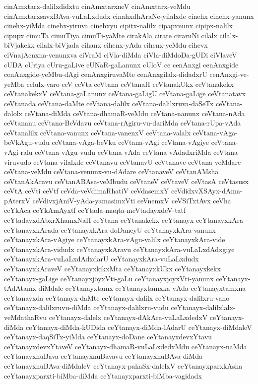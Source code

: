 {cinAmxtarx-dalilxdidxtu
cinAmxtarxneV
cinAmxtarx-veMdu
cinAmxtarxsavxBAva-vuLaLxdudx
cinahxdhAraNe-yilalxde
cinehx
cinehx-yanunx
cinehx-yiMda
cinehx-yiruva
cinehxyu
cipitx-nalilx
cipapxnunx
cipipx-nalilx
cipupx
cimuTa
cimuTiya
cimuTi-yaMte
cirakAla
cirate
ciraruNi
cilalx
cilalx-biVjakekx
cilalx-biVjada
cihanx
cihenx-yAda
cihenx-yeMdu
cihevx
ciVnajAcnxna-venunxva
ciVraM
ciVla-diMda
ciVla-diMdoDa-gUDi
ciVlaveV
cUDA
cUriya
cUru-gaLive
cUNaR-gaLanunx
cUloV
ce
cenAnxgi
cenAnxgide
cenAnxgide-yeMbu-dAgi
cenAnxgiruvaMte
cenAnxgilalx-didadxrU
cenAnxgi-ve-yeMba
celulx-varo
ceV
ceVta
ceVtana
ceVtanaH
ceVtanakUkx
ceVtanakekx
ceVtanakekxV
ceVtana-gaLanunx
ceVtana-gaLigU
ceVtana-gaLige
ceVtanatavx
ceVtanada
ceVtana-daMte
ceVtana-dalilx
ceVtana-dalilxruva-daSeTx
ceVtana-dalolx
ceVtana-diMda
ceVtana-dhamaR-veMdu
ceVtana-nanunx
ceVtana-nAda
ceVtananu
ceVtana-BeVdavu
ceVtana-rAgiru-vu-dariMda
ceVtana-rUpa-vAda
ceVtanalilx
ceVtana-vanunx
ceVtana-vanenxV
ceVtana-valalx
ceVtana-vAga-beVkAgu-vudu
ceVtana-vAga-beVku
ceVtana-vAgi
ceVtana-vAgiye
ceVtana-vAgi-ralu
ceVtana-vAgu-vudu
ceVtana-vAda
ceVtana-vAdadxriMda
ceVtana-viruvudo
ceVtana-vilalxde
ceVtanavu
ceVtanavU
ceVtanave
ceVtana-veMdare
ceVtana-veMdu
ceVtana-venunx-vu-dAdare
ceVtanaveV
ceVtanAMsha
ceVtanAkAravu
ceVtanABAsa-veMbudu
ceVtaneV
ceVtaveV
ceVtasA
ceVtasusx
ceVtA
ceVti
ceVtf
ceVda-veVdimaRhatiV
ceVdasemxY
ceVdidxvXSAyx-dAma-pAterxV
ceVdivxjAniV-yAda-yamasimxVti
ceVnemxV
ceVSiTxtAvx
ceVha
ceYkAca
ceYkAmAyxtf
ceYtada-maqta-meVtadayxdeV-tatf
ceYtadayxdAbxrXhamxNaH
ceYtana
ceYtanakekx
ceYtanayx
ceYtanayxkAra
ceYtanayxkArada
ceYtanayxkAra-doDaneyU
ceYtanayxkAra-vanunx
ceYtanayxkAra-vAgiye
ceYtanayxkAra-vAgu-valilx
ceYtanayxkAra-vide
ceYtanayxkAra-vidudx
ceYtanayxkAravu
ceYtanayxkAra-vuLaLxdAdxgiye
ceYtanayxkAra-vuLaLxdAdxdarU
ceYtanayxkAra-vuLaLxdudx
ceYtanayxkAraveV
ceYtanayxkikxMta
ceYtanayxkUkx
ceYtanayxkekx
ceYtanayx-gaLige
ceYtanayxjoyxVti-gaLu
ceYtanayxjoyxVti-yanunx
ceYtanayx-tAdAtamx-diMdale
ceYtanayxtamx
ceYtanayxtamxka-vAda
ceYtanayxtamxna
ceYtanayxda
ceYtanayx-daMte
ceYtanayx-dalilx
ceYtanayx-dalilxru-vano
ceYtanayx-dalilxruvu-diMda
ceYtanayx-dalilxru-vudu
ceYtanayx-dalilxlalx-veMdathaRvu
ceYtanayx-dalelx
ceYtanayx-dAkAra-vuLaLxdedxV
ceYtanayx-diMda
ceYtanayx-diMda-kUDida
ceYtanayx-diMda-lAdarU
ceYtanayx-diMdaleV
ceYtanayx-daqSiTx-yiMda
ceYtanayx-doDane
ceYtanayxdevxYtavu
ceYtanayxdevxYtaveV
ceYtanayx-dhamaR-vuLaLxdedxMdu
ceYtanayx-naMda
ceYtanayxnuBava
ceYtanayxnuBavavu
ceYtanayxnuBAva-diMda
ceYtanayxnuBAva-diMdaleV
ceYtanayx-pakaSx-dalelxV
ceYtanayxparxkAsha
ceYtanayxparxti-biMba-diMda
ceYtanayxparxti-biMba-vagidadx
}
